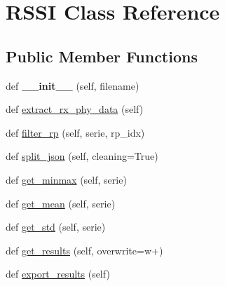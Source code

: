 \hypertarget{classread_r_s_s_i_1_1_r_s_s_i}{}\section{R\+S\+SI Class Reference}
\label{classread_r_s_s_i_1_1_r_s_s_i}
\subsection*{Public Member Functions}
\begin{DoxyCompactItemize}
\item 
\mbox{\label{classread_r_s_s_i_1_1_r_s_s_i_ad5de178e9da2711c5bc270200dc25568}} 
def {\bfseries \+\_\+\+\_\+init\+\_\+\+\_\+} (self, filename)
\item 
def \mbox{\hyperlink{classread_r_s_s_i_1_1_r_s_s_i_a789b90763802b8501acc3429b812eb22}{extract\+\_\+rx\+\_\+phy\+\_\+data}} (self)
\item 
def \mbox{\hyperlink{classread_r_s_s_i_1_1_r_s_s_i_a034043a5eeb333fe7dacf9e1f878422c}{filter\+\_\+rp}} (self, serie, rp\+\_\+idx)
\item 
def \mbox{\hyperlink{classread_r_s_s_i_1_1_r_s_s_i_a74a17d56ebc1e8701113d8e4abd6b797}{split\+\_\+json}} (self, cleaning=True)
\item 
def \mbox{\hyperlink{classread_r_s_s_i_1_1_r_s_s_i_a7a31b347c000b7624f257c7cf92fa722}{get\+\_\+minmax}} (self, serie)
\item 
def \mbox{\hyperlink{classread_r_s_s_i_1_1_r_s_s_i_a9cdb2fa1f6f9a7e43ed6ec1ce2b05b1d}{get\+\_\+mean}} (self, serie)
\item 
def \mbox{\hyperlink{classread_r_s_s_i_1_1_r_s_s_i_a09db525fa9cf4e5f1b3b56e0d35c899e}{get\+\_\+std}} (self, serie)
\item 
def \mbox{\hyperlink{classread_r_s_s_i_1_1_r_s_s_i_a822bae445ade3de0a493f36b3d9540db}{get\+\_\+results}} (self, overwrite=\textquotesingle{}w+\textquotesingle{})
\item 
def \mbox{\hyperlink{classread_r_s_s_i_1_1_r_s_s_i_a7f770c7daa5311635963ea5110c357fb}{export\+\_\+results}} (self)
\end{DoxyCompactItemize}
